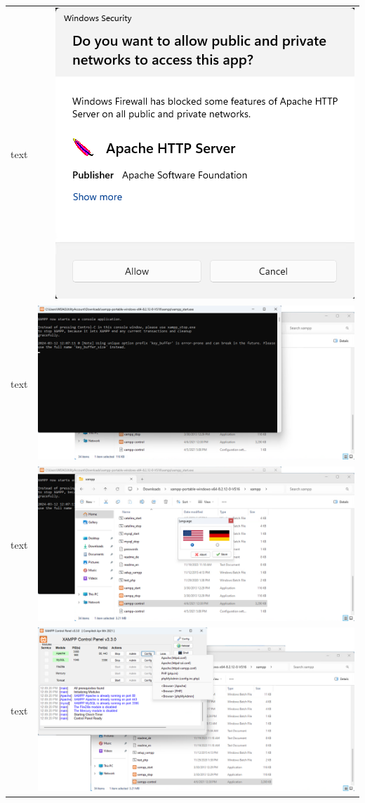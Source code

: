 \documentclass[11pt,a4paper]{report}
\begin{document}
\begin{tabular}{ l r }
            text & \includegraphics[scale=1.0]{xampp12} \\
            text & \includegraphics[scale=1.0]{xampp13} \\
            text & \includegraphics[scale=1.0]{xampp14} \\
            text & \includegraphics[scale=1.0]{xampp15} \\

\end{tabular}
\end{document}
